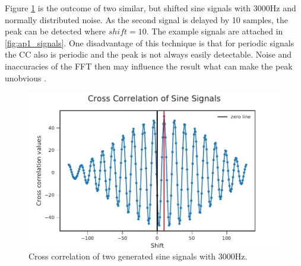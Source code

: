 Figure \cref{fig:03_ccTheory} is the outcome of two similar, but shifted sine signals with
3000\si{Hz} and normally distributed noise.
As the second signal is delayed by 10 samples, the peak can be detected where $shift = 10$.
The example signals are attached in \cref{fig:ap1_signals}.
One disadvantage of this technique is that for periodic signals the \ac{CC} also is periodic
and the peak is not always easily detectable. Noise and inaccuracies of the \ac{FFT} then
may influence the result what can make the peak unobvious \cite{L_L_GCC}.
\begin{figure}[ht]
	\centering
		\includegraphics[width=1\columnwidth]{figures/CC_theory}
	\caption{Cross correlation of two generated sine signals with 3000Hz.}
    \label{fig:03_ccTheory}
\end{figure}
